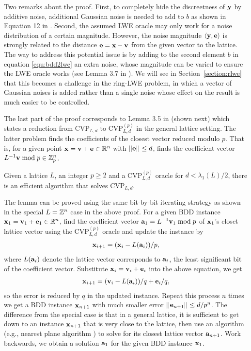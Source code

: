 \documentclass[../main.tex]{subfiles}
\begin{document}
Two remarks about the proof. First, to completely hide the discreetness of $\mathbf{y}$ by additive noise, additional Gaussian noise is needed to add to $b$ as shown in Equation 12 in \citep{regev2009lattices}. Second, the assumed LWE oracle may only work for a noise distribution of a certain magnitude. However, the noise magnitude $\langle \mathbf{y},\mathbf{e} \rangle$ is strongly related to the distance $\mathbf{e} = \mathbf{x} -\mathbf{v}$ from the given vector to the lattice. The way to address this potential issue is by adding to the second element $b$ in equation \ref{equ:bdd2lwe} an extra noise, whose magnitude can be varied to ensure the LWE oracle works (see Lemma 3.7 in \cite{regev2009lattices}). We will see in Section~\ref{section:rlwe} that this becomes a challenge in the ring-LWE problem, in which a vector of Gaussian noises is added rather than a single noise whose effect on the result is much easier to be controlled.  

The last part of the proof corresponds to Lemma 3.5 in \cite{regev2009lattices} (shown next) which states a reduction from CVP$_{L,d}$ to CVP$_{L,d}^{(p)}$ in the general lattice setting. The latter problem finds the coefficients of the closest vector reduced modulo $p$. 
That is, for a given point $\mathbf{x}=\mathbf{v}+\mathbf{e} \in \mathbb{R}^n$ with $||\mathbf{e}||\le d$, finds the coefficient vector $L^{-1} \mathbf{v} \bmod p \in \mathbb{Z}_p^n$.  
 

\begin{lemma}
\label{lm:lweCoeffModQ}
Given a lattice $L$, an integer $p \ge 2$ and a CVP$_{L,d}^{(p)}$ oracle for $d < \lambda_1(L)/2$, there is an efficient algorithm that solves CVP$_{L,d}$.   
\end{lemma}

The lemma can be proved using the same bit-by-bit iterating strategy as shown in the special $L=\mathbb{Z}^n$ case in the above proof. For a given BDD instance $\mathbf{x}_1 = \mathbf{v}_1 + \mathbf{e}_1 \in \mathbb{R}^n$, find the coefficient vector $\mathbf{a}_1 = L^{-1} \mathbf{v}_1 \bmod p$ of $\mathbf{x}_1$'s closet lattice vector using the CVP$_{L,d}^{(p)}$ oracle and update the instance by 
\begin{align*}
    \mathbf{x}_{i+1} = (\mathbf{x}_i - L(\mathbf{a}_i))/p,
\end{align*}
where $L(\mathbf{a}_i)$ denote the lattice vector corresponds to $\mathbf{a}_i$, the least significant bit of the coefficient vector. Substitute $\mathbf{x}_i= \mathbf{v}_i + \mathbf{e}_i$ into the above equation, we get 
\begin{align*}
    \mathbf{x}_{i+1} = (\mathbf{v}_i - L(\mathbf{a}_i))/q + \mathbf{e}_i/q,
\end{align*}
so the error is reduced by $q$ in the updated instance. Repeat this process $n$ times we get a BDD instance $\mathbf{x}_{n+1}$ with much smaller error $||\mathbf{e}_{n+1}||\le d/p^n$.
The difference from the special case is that in a general lattice, it is sufficient to get down to an instance $\mathbf{x}_{n+1}$ that is very close to the lattice, then use an algorithm (e.g., nearest plane algorithm \citep{babai1986lovasz}) to solve for its closest lattice vector $\mathbf{a}_{n+1}$. Work backwards, we obtain a solution $\mathbf{a}_1$ for the given BDD instance $\mathbf{x}_1$.
\end{document}
